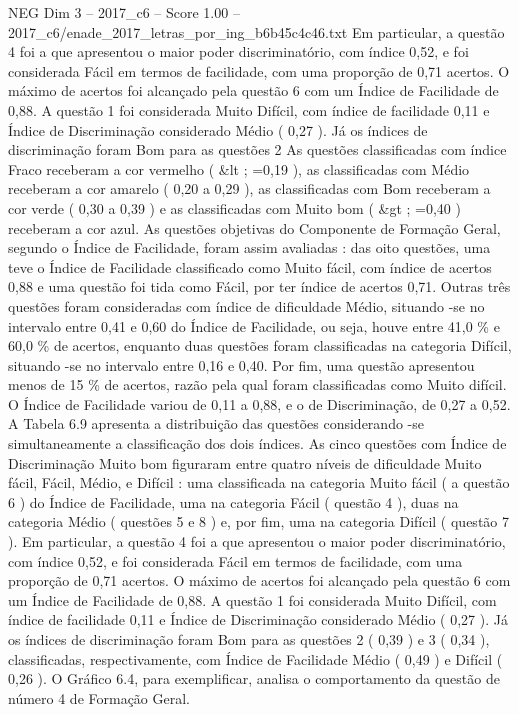 \begin{textsample}{NEG Dim 3 – 2017\_c6 – Score 1.00 – 2017\_c6/enade\_2017\_letras\_por\_ing\_b6b45c4c46.txt}
Em particular, a questão 4 foi a que apresentou o maior poder discriminatório, com índice 0,52, e foi considerada Fácil em termos de facilidade, com uma proporção de 0,71 acertos.
O máximo de acertos foi alcançado pela questão 6 com um Índice de Facilidade de 0,88.
A questão 1 foi considerada Muito Difícil, com índice de facilidade 0,11 e Índice de Discriminação considerado Médio ( 0,27 ).
Já os índices de discriminação foram Bom para as questões 2 As questões classificadas com índice Fraco receberam a cor vermelho ( \&lt ; =0,19 ), as classificadas com Médio receberam a cor amarelo ( 0,20 a 0,29 ), as classificadas com Bom receberam a cor verde ( 0,30 a 0,39 ) e as classificadas com Muito bom ( \&gt ; =0,40 ) receberam a cor azul.
As questões objetivas do Componente de Formação Geral, segundo o Índice de Facilidade, foram assim avaliadas : das oito questões, uma teve o Índice de Facilidade classificado como Muito fácil, com índice de acertos 0,88 e uma questão foi tida como Fácil, por ter índice de acertos 0,71.
Outras três questões foram consideradas com índice de dificuldade Médio, situando -se no intervalo entre 0,41 e 0,60 do Índice de Facilidade, ou seja, houve entre 41,0 \% e 60,0 \% de acertos, enquanto duas questões foram classificadas na categoria Difícil, situando -se no intervalo entre 0,16 e 0,40.
Por fim, uma questão apresentou menos de 15 \% de acertos, razão pela qual foram classificadas como Muito difícil.
O Índice de Facilidade variou de 0,11 a 0,88, e o de Discriminação, de 0,27 a 0,52.
A Tabela 6.9 apresenta a distribuição das questões considerando -se simultaneamente a classificação dos dois índices.
As cinco questões com Índice de Discriminação Muito bom figuraram entre quatro níveis de dificuldade Muito fácil, Fácil, Médio, e Difícil : uma classificada na categoria Muito fácil ( a questão 6 ) do Índice de Facilidade, uma na categoria Fácil ( questão 4 ), duas na categoria Médio ( questões 5 e 8 ) e, por fim, uma na categoria Difícil ( questão 7 ).
Em particular, a questão 4 foi a que apresentou o maior poder discriminatório, com índice 0,52, e foi considerada Fácil em termos de facilidade, com uma proporção de 0,71 acertos.
O máximo de acertos foi alcançado pela questão 6 com um Índice de Facilidade de 0,88.
A questão 1 foi considerada Muito Difícil, com índice de facilidade 0,11 e Índice de Discriminação considerado Médio ( 0,27 ).
Já os índices de discriminação foram Bom para as questões 2 ( 0,39 ) e 3 ( 0,34 ), classificadas, respectivamente, com Índice de Facilidade Médio ( 0,49 ) e Difícil ( 0,26 ).
O Gráfico 6.4, para exemplificar, analisa o comportamento da questão de número 4 de Formação Geral.

\end{textsample}
